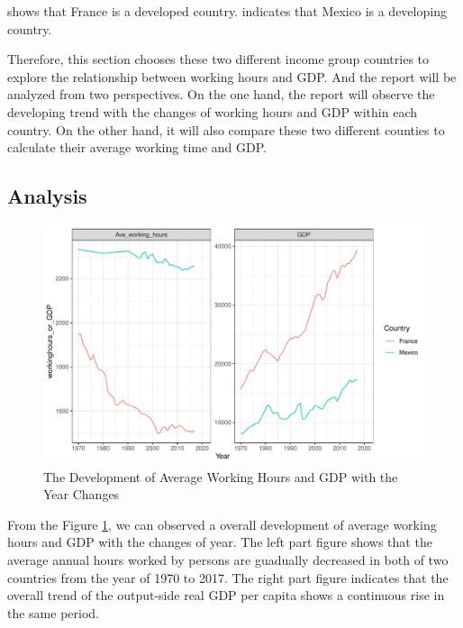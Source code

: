 \documentclass[11pt,a4paper,]{article}
\begin{document}
\textcite{reference1} shows that France is a developed country. \textcite{reference2} indicates that Mexico is a developing country.

Therefore, this section chooses these two different income group countries to explore the relationship between working hours and GDP. And the report will be analyzed from two perspectives. On the one hand, the report will observe the developing trend with the changes of working hours and GDP within each country. On the other hand, it will also compare these two different counties to calculate their average working time and GDP.

\hypertarget{analysis}{%
\subsection{Analysis}\label{analysis}}

\begin{figure}

{\centering \includegraphics{report_files/figure-latex/timechanges-1} 

}

\caption{The Development of Average Working Hours and GDP with the Year Changes}\label{fig:timechanges}
\end{figure}

From the Figure \ref{fig:timechanges}, we can observed a overall development of average working hours and GDP with the changes of year. The left part figure shows that the average annual hours worked by persons are guadually decreased in both of two countries from the year of 1970 to 2017. The right part figure indicates that the overall trend of the output-side real GDP per capita shows a continuous rise in the same period.
\end{document}
